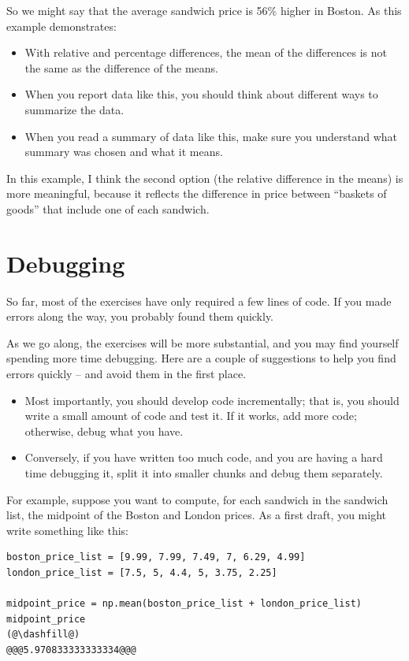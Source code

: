 So we might say that the average sandwich price is 56\% higher in
Boston. As this example demonstrates:

\begin{itemize}
\item
  With relative and percentage differences, the mean of the differences
  is not the same as the difference of the means.
\item
  When you report data like this, you should think about different ways
  to summarize the data.
\item
  When you read a summary of data like this, make sure you understand
  what summary was chosen and what it means.
\end{itemize}

In this example, I think the second option (the relative difference in
the means) is more meaningful, because it reflects the difference in
price between ``baskets of goods'' that include one of each sandwich.

\hypertarget{debugging}{%
\section{Debugging}\label{debugging}}

So far, most of the exercises have only required a few lines of code. If
you made errors along the way, you probably found them quickly.

As we go along, the exercises will be more substantial, and you may find
yourself spending more time debugging. Here are a couple of suggestions
to help you find errors quickly -- and avoid them in the first place.

\begin{itemize}
\item
  Most importantly, you should develop code incrementally; that is, you
  should write a small amount of code and test it. If it works, add more
  code; otherwise, debug what you have.
\item
  Conversely, if you have written too much code, and you are having a
  hard time debugging it, split it into smaller chunks and debug them
  separately.
\end{itemize}

For example, suppose you want to compute, for each sandwich in the
sandwich list, the midpoint of the Boston and London prices. As a first
draft, you might write something like this:

\begin{lstlisting}[]
boston_price_list = [9.99, 7.99, 7.49, 7, 6.29, 4.99]
london_price_list = [7.5, 5, 4.4, 5, 3.75, 2.25]

midpoint_price = np.mean(boston_price_list + london_price_list)
midpoint_price
(@\dashfill@)
@@@5.970833333333334@@@
\end{lstlisting}

